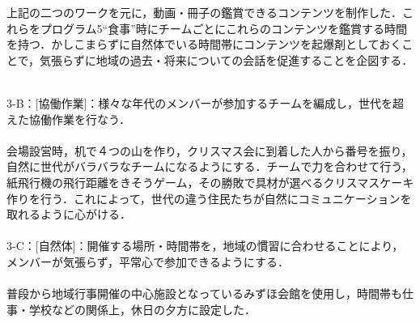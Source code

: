 \documentclass[a4paper]{jsarticle}
\begin{document}
\begin{itemize}
上記の二つのワークを元に，動画・冊子の鑑賞できるコンテンツを制作した．これらをプログラム5“食事”時にチームごとにこれらのコンテンツを鑑賞する時間を持つ．かしこまらずに自然体でいる時間帯にコンテンツを起爆剤としておくことで，気張らずに地域の過去・将来についての会話を促進することを企図する．\\\\


\end{itemize}
3-B：[協働作業]：様々な年代のメンバーが参加するチームを編成し，世代を超えた協働作業を行なう．\\\\
会場設営時，机で４つの山を作り，クリスマス会に到着した人から番号を振り，自然に世代がバラバラなチームになるようにする．チームで力を合わせて行う，紙飛行機の飛行距離をきそうゲーム，その勝敗で具材が選べるクリスマスケーキ作りを行う．これによって，世代の違う住民たちが自然にコミュニケーションを取れるように心がける．\\\\

3-C：[自然体]：開催する場所・時間帯を，地域の慣習に合わせることにより，メンバーが気張らず，平常心で参加できるようにする．\\\\
普段から地域行事開催の中心施設となっているみずほ会館を使用し，時間帯も仕事・学校などの関係上，休日の夕方に設定した．\\\\
\end{document}
